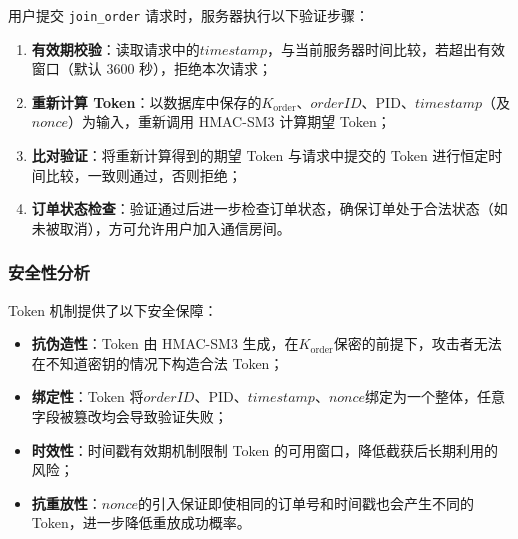 用户提交 \texttt{join\_order} 请求时，服务器执行以下验证步骤：



\begin{enumerate}[label=\arabic*., leftmargin=2em]
  \item \textbf{有效期校验}：读取请求中的$\mathit{timestamp}$，与当前服务器时间比较，若超出有效窗口（默认 3600 秒），拒绝本次请求；
  \item \textbf{重新计算 Token}：以数据库中保存的$K_{\mathrm{order}}$、$\mathit{orderID}$、$\mathrm{PID}$、$\mathit{timestamp}$（及$\mathit{nonce}$）为输入，重新调用 HMAC-SM3 计算期望 Token；
  \item \textbf{比对验证}：将重新计算得到的期望 Token 与请求中提交的 Token 进行恒定时间比较，一致则通过，否则拒绝；
  \item \textbf{订单状态检查}：验证通过后进一步检查订单状态，确保订单处于合法状态（如未被取消），方可允许用户加入通信房间。
\end{enumerate}

\subsubsection*{安全性分析}

Token 机制提供了以下安全保障：

\begin{itemize}[leftmargin=2em]
  \item \textbf{抗伪造性}：Token 由 HMAC-SM3 生成，在$K_{\mathrm{order}}$保密的前提下，攻击者无法在不知道密钥的情况下构造合法 Token；
  \item \textbf{绑定性}：Token 将$\mathit{orderID}$、$\mathrm{PID}$、$\mathit{timestamp}$、$\mathit{nonce}$绑定为一个整体，任意字段被篡改均会导致验证失败；
  \item \textbf{时效性}：时间戳有效期机制限制 Token 的可用窗口，降低截获后长期利用的风险；
  \item \textbf{抗重放性}：$\mathit{nonce}$的引入保证即使相同的订单号和时间戳也会产生不同的 Token，进一步降低重放成功概率。
\end{itemize}
